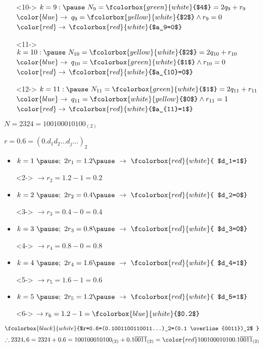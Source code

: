 \documentclass[8pt]{beamer}
\begin{document}
\begin{frame}
\begin{itemize}
			\item[]<10->  $k=9 : \pause \ N_9 = \fcolorbox{green}{white}{$4$}=2q_9+r_9$ \pause $\color{blue}\rightarrow$ $ q_9=\fcolorbox{yellow}{white}{$2$}  \wedge  r_9=0$ \pause $\color{red}\rightarrow$  $\fcolorbox{red}{white}{$a_9=0$}$
			\item[]<11-> $k=10 : \pause \ N_{10} = \fcolorbox{yellow}{white}{$2$}=2q_{10}+r_{10}$ \pause $\color{blue}\rightarrow$ $ q_{10}=\fcolorbox{green}{white}{$1$}  \wedge  r_{10}=0$ \pause $\color{red}\rightarrow$  $\fcolorbox{red}{white}{$a_{10}=0$}$
			\item[]<12-> $k=11 : \pause \ N_{11} = \fcolorbox{green}{white}{$1$}=2q_{11}+r_{11}$ \pause $\color{blue}\rightarrow$ $ q_{11}=\fcolorbox{white}{yellow}{$0$}  \wedge  r_{11}=1$ \pause $\color{red}\rightarrow$  $\fcolorbox{red}{white}{$a_{11}=1$}$\pause
		\end{itemize}
				\centering$N=2324=100100010100_{(2)}$
	\end{frame}
	\begin{frame}
		\centering $r=0.6=(0.d_1d_2...d_j...)_2$
		\begin{itemize}
		\item	$k=1 \ \pause ; \ 2r_1=1.2 \pause \ \rightarrow \ \fcolorbox{red}{white}{ $d_1=1$}$\pause 
		\item[]<2-> \hspace{2.5cm}$ \rightarrow r_2=1.2-1=0.2$\pause
		\item 	$k=2 \ \pause ; \ 2r_2=0.4 \pause \ \rightarrow \ \fcolorbox{red}{white}{ $d_2=0$}$\pause  
		\item[]<3-> \hspace{2.5cm}$ \rightarrow r_3=0.4-0=0.4$\pause
		\item	$k=3 \ \pause ; \ 2r_3=0.8 \pause \ \rightarrow \ \fcolorbox{red}{white}{ $d_3=0$}$\pause  
		\item[]<4-> \hspace{2.5cm}$ \rightarrow r_4=0.8-0=0.8$\pause
		\item	$k=4 \ \pause ; \ 2r_4=1.6 \pause \ \rightarrow \ \fcolorbox{red}{white}{ $d_4=1$}$\pause  
		\item[]<5-> \hspace{2.5cm}$ \rightarrow r_5=1.6-1=0.6$\pause
		\item	$k=5 \ \pause ; \ 2r_5=1.2 \pause \ \rightarrow \ \fcolorbox{red}{white}{ $d_5=1$}$\pause  
		\item[]<6-> \hspace{2.5cm}$ \rightarrow r_6=1.2-1=\fcolorbox{blue}{white}{$0.2$}$\pause 
		\end{itemize}
		\centering $\fcolorbox{black}{white}{$r=0.6=(0.1001100110011...)_2=(0.1 \overline{0011})_2$ }$\pause
		$$\therefore 2324,6 = 2324 +0.6 = 100100010100_{(2)}+0.1 \overline{0011}_{(2)}=\color{red}100100010100.1 \overline{0011}_{(2)}$$
	\end{frame}
\end{document}
